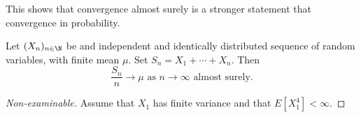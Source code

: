 \documentclass[../Main.tex]{subfiles}
\begin{document}
\begin{remark}
    This shows that convergence almost surely is a stronger statement that convergence in probability.
\end{remark}
\begin{theorem}
    Let $(X_n)_{n \in \N}$ be and independent and identically distributed sequence of random variables, with finite mean $\mu$. Set $S_n = X_1 + \cdots + X_n$. Then
    \begin{equation*}
        \frac{S_n}{n} \to \mu \text{ as } n \to \infty \text{ almost surely.}
    \end{equation*}
    \label{thmStrongLawLargeNums}
\end{theorem}
\begin{proof}[Non-examinable]
    Assume that $X_1$ has finite variance and that $E[X_1^4] < \infty$.


\end{proof}
\end{document}
